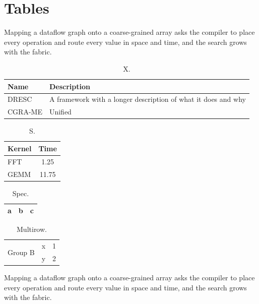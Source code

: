 \documentclass{article}
\begin{document}
\section{Tables}
Mapping a dataflow graph onto a coarse-grained array asks the compiler to place every operation and route every value in space and time, and the search grows with the fabric.

\begin{table}[h]\centering\begin{tabularx}{\linewidth}{lX}\toprule Name & Description\\\midrule DRESC & A framework with a longer description of what it does and why\\ CGRA-ME & Unified\\\bottomrule\end{tabularx}\caption{X.}\end{table}
\begin{table}[h]\centering\begin{tabular}{lS[table-format=2.2]}\toprule Kernel & {Time}\\\midrule FFT & 1.25\\ GEMM & 11.75\\\bottomrule\end{tabular}\caption{S.}\end{table}
\begin{table}[h]\centering\begin{tabular}{lll}\toprule a & b & c\\\bottomrule\end{tabular}\caption{Spec.}\end{table}
\begin{table}[h]\centering\begin{tabular}{llr}\toprule \multirow{2}{*}{Group B} & x & 1\\ & y & 2\\\bottomrule\end{tabular}\caption{Multirow.}\end{table}
Mapping a dataflow graph onto a coarse-grained array asks the compiler to place every operation and route every value in space and time, and the search grows with the fabric.
\end{document}
